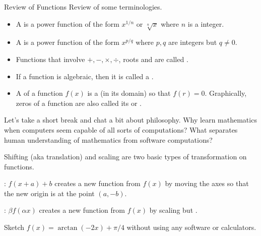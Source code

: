 \documentclass[../main.tex]{subfiles}
\begin{document}
\begin{lesson}{Review of Functions}
  Review of some terminologies. 
  \begin{itemize}[noitemsep]
    \item A  is a power function of the form \(x^{1/n}\) or \(\sqrt[n]{x}\) where \(n\) is a  integer. 

    \item A  is a power function of the form \(x^{p/q}\) where \(p,q\) are integers but \(q \ne 0\).

    \item Functions that involve \(+, -, \times, \div\), roots and  are called . 

    \item If a function is  algebraic, then it is called a .

    \item A  of a function \(f(x)\) is a  (in its domain) so that \(f(r) = 0\).  Graphically, zeros of a function are also called its  or \hlmain{\underline{\hspace{1in}}}.
  \end{itemize}

  Let's take a short break and chat a bit about philosophy. \faComments{} Why learn mathematics when computers seem capable of all sorts of computations? \faComments{} What separates human understanding of mathematics from software computations?
  \clearpage

  Shifting (aka translation) and scaling are two basic types of transformation on functions.

  : \(f(x + a) + b\) creates a new function from \(f(x)\) by moving the axes so that the new origin is at the point \((a, -b)\).

  : \(\beta f(\alpha x)\) creates a new function from \(f(x)\) by scaling  but .

  \clearpage
  \begin{example}
    Sketch \(f(x) = \arctan(-2x) + \pi/4\) without using any software or calculators.


\end{example}
\end{lesson}
\end{document}
